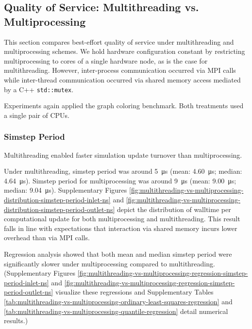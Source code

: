\subsection{Quality of Service: Multithreading vs. Multiprocessing}
\label{sec:multithreading-vs-multiprocessing}

This section compares best-effort quality of service under multithreading and multiprocessing schemes.
We hold hardware configuration constant by restricting multiprocessing to cores of a single hardware node, as is the case for multithreading.
However, inter-process communication occurred via MPI calls while inter-thread communication occurred via shared memory access mediated by a C++ \texttt{std::mutex}.

Experiments again applied the graph coloring benchmark.
Both treatments used a single pair of CPUs.

\subsubsection{Simstep Period}

Multithreading enabled faster simulation update turnover than multiprocessing.

Under multithreading, simstep period was around \SI{5}{\micro\second} (mean: \SI{4.60}{\micro\second}; median: \SI{4.64}{\micro\second}).
Simstep period for multiprocessing was around \SI{9}{\micro\second} (mean: \SI{9.00}{\micro\second}; median: \SI{9.04}{\micro\second}).
Supplementary Figures \ref{fig:multithreading-vs-multiprocessing-distribution-simstep-period-inlet-ns} and \ref{fig:multithreading-vs-multiprocessing-distribution-simstep-period-outlet-ns} depict the distribution of walltime per computational update for both multiprocessing and multithreading.
This result falls in line with expectations that interaction via shared memory incurs lower overhead than via MPI calls.

Regression analysis showed that both mean and median simstep period were significantly slower under multiprocessing compared to multithreading.
(Supplementary Figures \ref{fig:multithreading-vs-multiprocessing-regression-simstep-period-inlet-ns} and \ref{fig:multithreading-vs-multiprocessing-regression-simstep-period-outlet-ns} visualize these regressions and Supplementary Tables \ref{tab:multithreading-vs-multiprocessing-ordinary-least-squares-regression} and \ref{tab:multithreading-vs-multiprocessing-quantile-regression} detail numerical results.)

